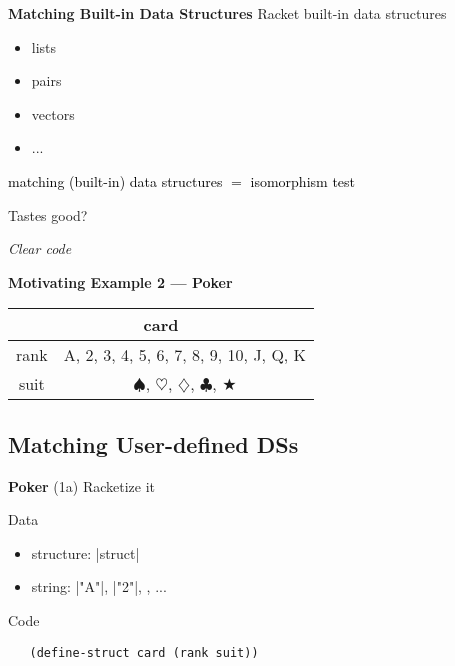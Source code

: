 \documentclass[12pt]{beamer}
\newcommand{\hl}[1]{\textcolor{black}{#1}}
\begin{document}
\begin{frame}{\bf Matching Built-in Data Structures}
 Racket built-in data structures
 \begin{itemize}
  \item lists
  \pause
  \item pairs
  \pause
  \item vectors
  \item ...
 \end{itemize}

 \pause

 \hl{matching (built-in) data structures $=$ isomorphism test}
\end{frame}

\begin{frame}[plain]
 \begin{center}
  {\LARGE
   Tastes good?
   
   \pause

   \em
   Clear code
  }
 \end{center}
\end{frame}

\begin{frame}[fragile]{\bf Motivating Example 2 --- Poker}
 \large
 \begin{table}
  \centering
  \begin{tabular}{c|c}
   \hline
   \multicolumn{2}{c}{card} \\
   \hline
   rank & A, 2, 3, 4, 5, 6, 7, 8, 9, 10, J, Q, K \\
   \hline
   suit & $\spadesuit$, $\heartsuit$, $\diamondsuit$, $\clubsuit$, $\bigstar$ \\
   \hline
  \end{tabular}
 \end{table}
\end{frame}

\subsection{Matching User-defined DSs}

\begin{frame}[fragile]{{\bf Poker} (1a)}
 Racketize it

 \pause

 Data
 \begin{itemize}
  \item structure: |struct|
  \pause
  \item string: |"A"|, |"2"|, \color{strcol}{\verb|"|$\spadesuit$\verb|"|}, ...
 \end{itemize}

 \pause

 Code
 {\footnotesize
  \begin{verbatim}
   (define-struct card (rank suit))
  \end{verbatim}
 }
\end{frame}
\end{document}
